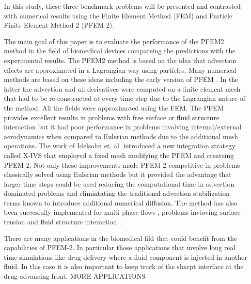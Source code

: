 In this study, these three benchmark problems will be presented and contrasted with numerical results using the Finite Element Method (FEM) and Particle Finite Element Method 2 (PFEM-2).


The main goal of this paper is to evaluate the performance of the PFEM2 method in the field of biomedical devices compareing the predictions with the experimental results. The PFEM2 method is based on the idea that advection effects are approximated in a Lagrangian way using particles. Many numerical methods are based on these ideas \cite{sph,mps,pic,mac} including the early version of PFEM \cite{sergio:PFEM}. In the latter the advection and all derivatives were computed on a finite element mesh that had to be re-constructed at every time step due to the Lagrangian nature of the method. All the fields were approximated using the FEM. The PFEM provides excellent results in problems with free surface or fluid structure interaction but it had poor performance in problems involving internal/external aerodynamics when compared to Eulerian methods due to the additional mesh operations. The work of Idelsohn et. al. \cite{sergio:xivs1,sergio:xivs2} introduced a new integration strategy called X-IVS that employed a fixed mesh modifying the PFEM and createing PFEM-2. Not only these improvements made PFEM-2 competitive in problems classically solved using Eulerian methods but it provided the advantage that larger time steps could be used \cite{gimenez:parallel} reducing the computational time in advection dominated problems and elimintating the traditional advection stabilization terms known to introduce additional numerical diffusion. The method has also been succesfully implemented for multi-phase flows \cite{sergio:pfem2_lts,gimenez:fs,gimenez:tesis}, problems invloving surface tension \cite{gimenez:st} and fluid structure interaction \cite{pablo:FSI}.

There are many applications in the biomedical fild that could benefit from the capabilities of PFEM-2. In particular those applications that involve long real time simulations like drug delivery where a fluid component is injected in another fluid. In this case it is also important to keep track of the sharpt interface at the drug advancing front. {MORE APPLICATIONS}

